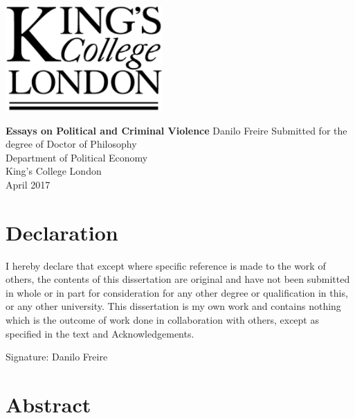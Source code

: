 \documentclass[a4paper,12pt]{report}
\newcommand{\linespacing}{1.5}
\renewcommand{\baselinestretch}{\linespacing}
\begin{document}




\thispagestyle{empty}
\begin{center}
\includegraphics[width=6cm]{kcl.eps}
\end{center}	
\vskip40mm
\begin{center}
\huge\textbf{Essays on Political and Criminal Violence}
\vskip2mm
\vskip5mm
\Large Danilo Freire
\normalsize
\vfill
\large
Submitted for the degree of Doctor of Philosophy \\
Department of Political Economy \\
King's College London	\\
April 2017
\end{center}	


\chapter*{Declaration}
\noindent 
I hereby declare that except where specific reference is made to the work of others, the contents of this dissertation are original and have not been submitted in whole or in part for consideration for any other degree or qualification in this, or any other university. This dissertation is my own work and contains nothing which is the outcome of work done in collaboration with others, except as specified in the text and Acknowledgements. 


\vskip20mm
\noindent
Signature:
\vskip20mm
\noindent 
Danilo Freire


\chapter*{Abstract}
\renewcommand{\baselinestretch}{\linespacing}
\small\normalsize
\end{document}
